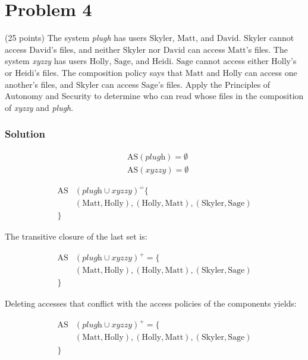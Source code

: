 \section*{Problem 4}
(25 points) The system \textit{plugh} has users $\text{Skyler}$, $\text{Matt}$, and $\text{David}$. 
$\text{Skyler}$ cannot access $\text{David}$’s files, and neither $\text{Skyler}$ nor $\text{David}$ can access $\text{Matt}$’s files. 
The system \textit{xyzzy} has users $\text{Holly}$, $\text{Sage}$, and $\text{Heidi}$. 
$\text{Sage}$ cannot access either $\text{Holly}$’s or $\text{Heidi}$’s files. 
The composition policy says that $\text{Matt}$ and $\text{Holly}$ can access one another’s files, and $\text{Skyler}$ can access $\text{Sage}$'s files. 
Apply the Principles of Autonomy and Security to determine who can read whose files in the composition of \textit{xyzzy} and \textit{plugh}.

\subsubsection*{Solution}

\begin{align*}
    & \text{AS}(\textit{plugh}) = \emptyset \\
    & \text{AS}(\textit{xyzzy}) = \emptyset   
\end{align*}

\begin{align*}
    \text{AS} & (\textit{plugh} \cup \textit{xyzzy})^ = \{ \\
    & (\text{Matt}, \text{Holly}), (\text{Holly}, \text{Matt}), (\text{Skyler}, \text{Sage}) \\
    \}  
\end{align*}

The transitive closure of the last set is:

\begin{align*}
    \text{AS} & (\textit{plugh} \cup \textit{xyzzy})^+ = \{ \\
    & (\text{Matt}, \text{Holly}), (\text{Holly}, \text{Matt}), (\text{Skyler}, \text{Sage}) \\
    \}  
\end{align*}

Deleting accesses that conflict with the access policies of the components yields:

\begin{align*}
    \text{AS} & (\textit{plugh} \cup \textit{xyzzy})^+ = \{ \\
    & (\text{Matt}, \text{Holly}), (\text{Holly}, \text{Matt}), (\text{Skyler}, \text{Sage}) \\
    \}  
\end{align*}